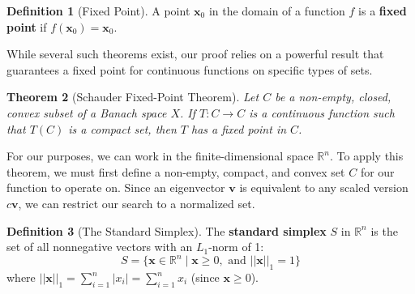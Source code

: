 \documentclass[12pt,a4paper]{report}
\theoremstyle{plain}
\newtheorem{theorem}{Theorem}[section]
\theoremstyle{definition}
\newtheorem{definition}[theorem]{Definition}
\theoremstyle{remark}
\begin{document}
\begin{definition}[Fixed Point]
A point $\bm{x}_0$ in the domain of a function $f$ is a \textbf{fixed point} if $f(\bm{x}_0) = \bm{x}_0$.
\end{definition}

While several such theorems exist, our proof relies on a powerful result that guarantees a fixed point for continuous functions on specific types of sets.

\begin{theorem}[Schauder Fixed-Point Theorem]\label{thm:schauder}
Let $C$ be a non-empty, closed, convex subset of a Banach space $X$. If $T: C \to C$ is a continuous function such that $T(C)$ is a compact set, then $T$ has a fixed point in $C$.
\end{theorem}

For our purposes, we can work in the finite-dimensional space $\mathbb{R}^n$. To apply this theorem, we must first define a non-empty, compact, and convex set $C$ for our function to operate on. Since an eigenvector $\bm{v}$ is equivalent to any scaled version $c\bm{v}$, we can restrict our search to a normalized set.

\begin{definition}[The Standard Simplex]\label{def:simplex}
The \textbf{standard simplex} $S$ in $\mathbb{R}^n$ is the set of all nonnegative vectors with an $L_1$-norm of 1:
$$ S = \{\bm{x} \in \mathbb{R}^n \mid \bm{x} \ge 0, \text{ and } ||\bm{x}||_1 = 1 \} $$
where $||\bm{x}||_1 = \sum_{i=1}^n |x_i| = \sum_{i=1}^n x_i$ (since $\bm{x} \ge 0$).
\end{definition}
\end{document}
